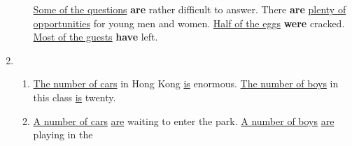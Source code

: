 \begin{enumerate}
\begin{enumerate}
{\begin{tabular}{lllll}
                    \end{tabular}
                }
                \newline
                \newline
                \underline{Some of the questions} \textbf{are} rather difficult
                to answer.
                \newline
                \newline
                There \textbf{are} \underline{plenty of opportunities} for young
                men and women.
                \newline
                \newline
                \underline{Half of the eggs} \textbf{were} cracked.
                \newline
                \newline
                \underline{Most of the guests} \textbf{have} left.
        \end{enumerate}
    \item
        \begin{enumerate}
            \item
                \newline
                \newline
                \underline{The number of cars} in Hong Kong \underline{is} enormous.
                \newline
                \newline
                \underline{The number of boys} in this class \underline{is} twenty.
            \item
                \newline
                \newline
                \underline{A number of cars} \underline{are} waiting to enter
                the park.
                \newline
                \newline
                \underline{A number of boys} \underline{are} playing in the

\end{enumerate}
\end{enumerate}
